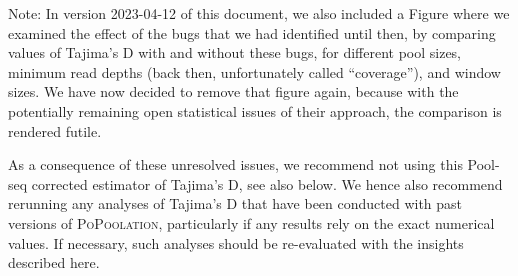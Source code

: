 \documentclass[letterpaper,fontsize=9pt,DIV=12]{scrartcl}
\newcommand\toolname{\textsc}
\begin{document}
Note: In version 2023-04-12 of this document, we also included a Figure where we examined the effect of the bugs that we had identified until then, by comparing values of Tajima's D with and without these bugs, for different pool sizes, minimum read depths (back then, unfortunately called ``coverage''), and window sizes.  We have now decided to remove that figure again, because with the potentially remaining open statistical issues of their approach, the comparison is rendered futile.

As a consequence of these unresolved issues, we recommend not using this Pool-seq corrected estimator of Tajima's D, see also below.
We hence also recommend rerunning any analyses of Tajima's D that have been conducted with past versions of \toolname{PoPoolation}, particularly if any results rely on the exact numerical values.  If necessary, such analyses should be re-evaluated with the insights described here.


\end{document}
